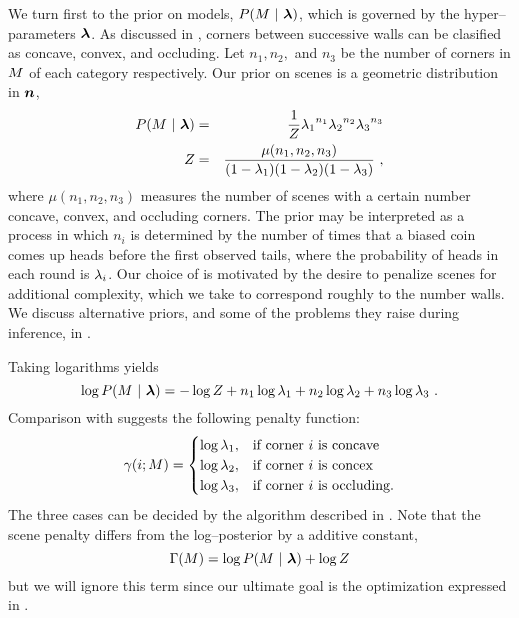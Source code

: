 We turn first to the prior on models, $P(\Scene~|~\Penalties)$, which
is governed by the hyper--parameters $\Penalties$. As discussed in
, corners between successive walls can be
clasified as concave, convex, and occluding. Let $n_1, n_2,$ and $n_3$
be the number of corners in $\Scene$ of each category
respectively. Our prior on scenes is a geometric distribution in
$\vect{n}$,
\begin{eqnarray}
  \label{eq:scene-prior}
  P(\Scene ~|~ \Penalties) &=& \frac{1}{Z} 
    {\PenaltyConc}^{n_1} {\PenaltyConv}^{n_2} {\PenaltyOccl}^{n_3}\\
  Z &=& \frac{\mu(n_1,n_2,n_3)}{(1-\PenaltyConc)(1-\PenaltyConv)(1-\PenaltyOccl)}~,
\end{eqnarray}
where $\mu(n_1,n_2,n_3)$ measures the number of scenes with a certain
number concave, convex, and occluding corners. The prior
 may be interpreted as a process in which $n_i$ is
determined by the number of times that a biased coin comes up heads
before the first observed tails, where the probability of heads in
each round is $\Penalty_i$. Our choice of  is
motivated by the desire to penalize scenes for additional complexity,
which we take to correspond roughly to the number walls. We discuss
alternative priors, and some of the problems they raise during
inference, in .

Taking logarithms yields
\begin{equation}
  \log P(\Scene ~|~ \Penalties) =
    -\log Z +
    n_1\log\PenaltyConc + 
    n_2\log\PenaltyConv + 
    n_3\log\PenaltyOccl~.
\end{equation}
Comparison with  suggests the following
penalty function:
\begin{equation}
  \label{eq:corner-penalty}
  \CornerPenalty(i;\Scene) = 
  \begin{cases}
    \log \PenaltyConc, & \mbox{if corner $i$ is concave} \\
    \log \PenaltyConv, & \mbox{if corner $i$ is concex} \\
    \log \PenaltyOccl, & \mbox{if corner $i$ is occluding.} \\
  \end{cases}
\end{equation}
The three cases can be decided by the algorithm described in
. Note that the scene penalty differs from
the log--posterior by a additive constant,
\begin{equation}
  \ScenePenalty(\Scene) = \log P(\Scene ~|~ \Penalties) + \log Z
\end{equation}
but we will ignore this term since our ultimate goal is the
optimization expressed in .

